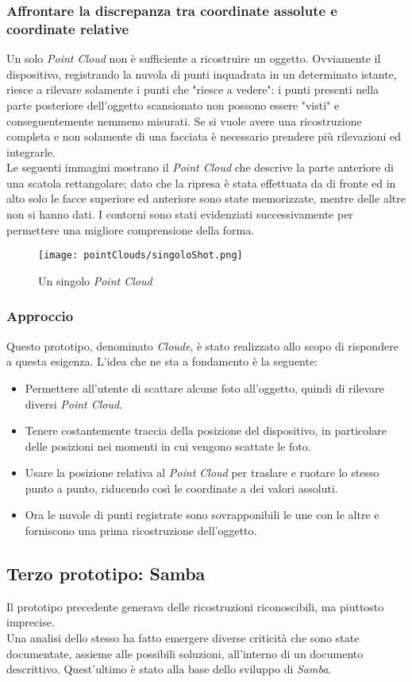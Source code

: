 \subsubsection{Affrontare la discrepanza tra coordinate assolute e coordinate relative}
Un solo \emph{Point Cloud} non è sufficiente a ricostruire un oggetto. Ovviamente il dispositivo, registrando la nuvola di punti inquadrata in un determinato istante, riesce a rilevare solamente i punti che "riesce a vedere": i punti presenti nella parte posteriore dell'oggetto scansionato non possono essere "visti" e conseguentemente nemmeno misurati. Se si vuole avere una ricostruzione completa e non solamente di una facciata è necessario prendere più rilevazioni ed integrarle.\\
Le seguenti immagini mostrano il \emph{Point Cloud} che descrive la parte anteriore di una scatola rettangolare; dato che la ripresa è stata effettuata da di fronte ed in alto solo le facce superiore ed anteriore sono state memorizzate, mentre delle altre non si hanno dati. I contorni sono stati evidenziati successivamente per permettere una migliore comprensione della forma.
\begin{figure}[!h] 
    \centering 
    \texttt{[image: pointClouds/singoloShot.png]} 
    \caption{Un singolo \emph{Point Cloud}}
\end{figure}
\subsubsection{Approccio}
Questo prototipo, denominato \emph{Cloude}, è stato realizzato allo scopo di rispondere a questa esigenza. L'idea che ne sta a fondamento è la seguente:
\begin{itemize}
	\item Permettere all'utente di scattare alcune foto all'oggetto, quindi di rilevare diversi \emph{Point Cloud}.
	\item Tenere costantemente traccia della posizione del dispositivo, in particolare delle posizioni nei momenti in cui vengono scattate le foto.
	\item Usare la posizione relativa al \emph{Point Cloud} per traslare e ruotare lo stesso punto a punto, riducendo così le coordinate a dei valori assoluti.
	\item Ora le nuvole di punti registrate sono sovrapponibili le une con le altre e forniscono una prima ricostruzione dell'oggetto.
\end{itemize}

\subsection{Terzo prototipo: Samba}
Il prototipo precedente generava delle ricostruzioni riconoscibili, ma piuttosto imprecise.\\
Una analisi dello stesso ha fatto emergere diverse criticità che sono state documentate, assieme alle possibili soluzioni, all'interno di un documento descrittivo. Quest'ultimo è stato alla base dello sviluppo di \emph{Samba}.
